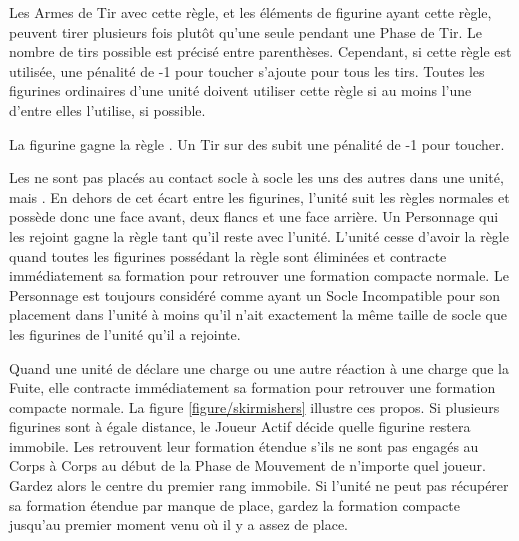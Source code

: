 
Les Armes de Tir avec cette règle, et les éléments de figurine ayant cette règle, peuvent tirer plusieurs fois plutôt qu'une seule pendant une Phase de Tir. Le nombre de tirs possible est précisé entre parenthèses. Cependant, si cette règle est utilisée, une pénalité de -1 pour toucher s'ajoute pour tous les tirs. Toutes les figurines ordinaires d'une unité doivent utiliser cette règle si au moins l'une d'entre elles l'utilise, si possible.


La figurine gagne la règle \newfromWHB{\lighttroops}. Un Tir sur des \skirmishers{} subit une pénalité de -1 pour toucher.

Les \skirmishers{} ne sont pas placés au contact socle à socle les uns des autres dans une unité, mais . En dehors de cet écart entre les figurines, l'unité suit les règles normales et possède donc une face avant, deux flancs et une face arrière.  Un Personnage qui les rejoint gagne la règle \skirmisher{} tant qu'il reste avec l'unité. L'unité cesse d'avoir la règle \skirmisher{} quand toutes les figurines possédant la règle sont éliminées et contracte immédiatement sa formation pour retrouver une formation compacte normale. Le Personnage est toujours considéré comme ayant un Socle Incompatible pour son placement dans l'unité à moins qu'il n'ait exactement la même taille de socle que les figurines de l'unité qu'il a rejointe.

Quand une unité de \skirmishers{} déclare une charge ou une autre réaction à une charge que la Fuite, elle contracte immédiatement sa formation pour retrouver une formation compacte normale.  La figure \ref{figure/skirmishers} illustre ces propos. Si plusieurs figurines sont à égale distance, le Joueur Actif décide quelle figurine restera immobile. Les \skirmishers{} retrouvent leur formation étendue s'ils ne sont pas engagés au Corps à Corps au début de la Phase de Mouvement de n'importe quel joueur. Gardez alors le centre du premier rang immobile. Si l'unité ne peut pas récupérer sa formation étendue par manque de place, gardez la formation compacte jusqu'au premier moment venu où il y a assez de place.

